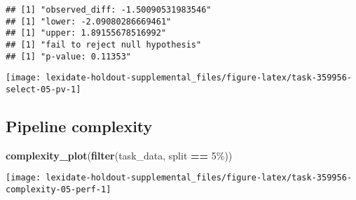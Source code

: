 \documentclass[
]{book}
\newenvironment{Shaded}{\begin{snugshade}}{\end{snugshade}}
\newcommand{\AttributeTok}[1]{\textcolor[rgb]{0.13,0.29,0.53}{#1}}
\newcommand{\DecValTok}[1]{\textcolor[rgb]{0.00,0.00,0.81}{#1}}
\newcommand{\FunctionTok}[1]{\textcolor[rgb]{0.13,0.29,0.53}{\textbf{#1}}}
\newcommand{\NormalTok}[1]{#1}
\newcommand{\OtherTok}[1]{\textcolor[rgb]{0.56,0.35,0.01}{#1}}
\newcommand{\SpecialCharTok}[1]{\textcolor[rgb]{0.81,0.36,0.00}{\textbf{#1}}}
\newcommand{\StringTok}[1]{\textcolor[rgb]{0.31,0.60,0.02}{#1}}
\begin{document}
\begin{Shaded}
\end{Shaded}

\begin{verbatim}
## [1] "observed_diff: -1.50090531983546"
## [1] "lower: -2.09080286669461"
## [1] "upper: 1.89155678516992"
## [1] "fail to reject null hypothesis"
## [1] "p-value: 0.11353"
\end{verbatim}

\texttt{[image: lexidate-holdout-supplemental\_files/figure-latex/task-359956-select-05-pv-1]}

\hypertarget{pipeline-complexity-24}{%
\subsection{Pipeline complexity}\label{pipeline-complexity-24}}

\begin{Shaded}
\begin{Highlighting}[]
\FunctionTok{complexity\_plot}\NormalTok{(}\FunctionTok{filter}\NormalTok{(task\_data, split }\SpecialCharTok{==} \StringTok{\textquotesingle{}5\%\textquotesingle{}}\NormalTok{))}
\end{Highlighting}
\end{Shaded}

\texttt{[image: lexidate-holdout-supplemental\_files/figure-latex/task-359956-complexity-05-perf-1]}
\end{document}
